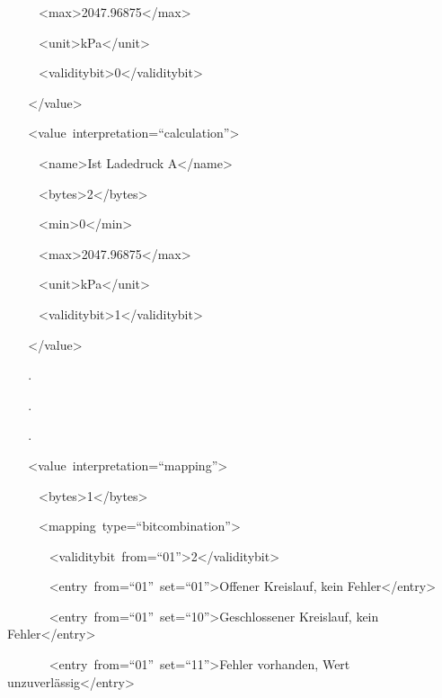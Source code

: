 {~ ~ ~
}{\textless{}max\textgreater{}}{2047.96875}{\textless{}/max\textgreater{}}

{~ ~ ~
}{\textless{}unit\textgreater{}}{kPa}{\textless{}/unit\textgreater{}}

{~ ~ ~
}{\textless{}validitybit\textgreater{}}{0}{\textless{}/validitybit\textgreater{}~~~~~~~~}

{~ ~ }{\textless{}/value\textgreater{}}

{~ ~
}{\textless{}value}{~}{interpretation}{=}{``calculation''\textgreater{}}

{~ ~ ~ }{\textless{}name\textgreater{}}{Ist Ladedruck
A}{\textless{}/name\textgreater{}}

{~ ~ ~
}{\textless{}bytes\textgreater{}}{2}{\textless{}/bytes\textgreater{}}

{~ ~ ~ }{\textless{}min\textgreater{}}{0}{\textless{}/min\textgreater{}}

{~ ~ ~
}{\textless{}max\textgreater{}}{2047.96875}{\textless{}/max\textgreater{}}

{~ ~ ~
}{\textless{}unit\textgreater{}}{kPa}{\textless{}/unit\textgreater{}~~~~~~~~}

{~ ~ ~
}{\textless{}validitybit\textgreater{}}{1}{\textless{}/validitybit\textgreater{}}{~~~~~~~~~~~~~~~~~~~~~~~~}

{~ ~ }{\textless{}/value\textgreater{}}

{~ ~ }{.}

{~ ~ }{.}

{~ ~ }{.}

{~ ~
}{\textless{}value}{~}{interpretation}{=}{``mapping''\textgreater{}}

{~ ~ ~
}{\textless{}bytes\textgreater{}}{1}{\textless{}/bytes\textgreater{}}

{~ ~ ~
}{\textless{}mapping}{~}{type}{=}{``bitcombination''\textgreater{}}

{~ ~ ~ ~
}{\textless{}validitybit}{~}{from}{=}{``01''}{\textgreater{}}{2}{\textless{}/validitybit\textgreater{}}

{~ ~ ~ ~
}{\textless{}entry}{~}{from}{=}{``01''}{~}{set}{=}{``01''}{\textgreater{}}{Offener
Kreislauf, kein Fehler}{\textless{}/entry\textgreater{}}

{~ ~ ~ ~
}{\textless{}entry}{~}{from}{=}{``01''}{~}{set}{=}{``10''}{\textgreater{}}{Geschlossener
Kreislauf, kein Fehler}{\textless{}/entry\textgreater{}}

{~ ~ ~ ~
}{\textless{}entry}{~}{from}{=}{``01''}{~}{set}{=}{``11''}{\textgreater{}}{Fehler
vorhanden, Wert unzuverlässig}{\textless{}/entry\textgreater{}}

